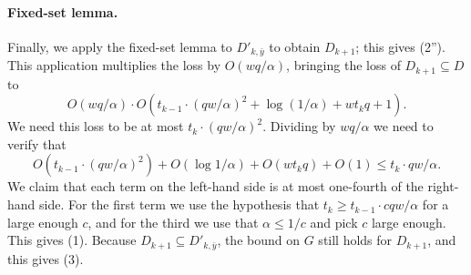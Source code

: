\paragraph{Fixed-set lemma.}
Finally, we apply the fixed-set lemma to $D'_{k,\bar y}$ to obtain $D_{k+1}$; this gives (2''). This application multiplies the loss by $O(wq/\alpha)$, bringing the loss of $D_{k+1}\subseteq D$ to
\[O(wq/\alpha)\cdot O(t_{k-1}\cdot(qw/\alpha)^2+\log(1/\alpha)+wt_kq+1).\]
We need this loss to be at most $t_k\cdot(qw/\alpha)^2$. Dividing by $wq/\alpha$ we need to verify that
\[O(t_{k-1}\cdot(qw/\alpha)^2)+O(\log1/\alpha)+O(wt_kq)+O(1)\leq t_k\cdot qw/\alpha.\]
We claim that each term on the left-hand side is at most one-fourth of the right-hand side. For the first term we use the hypothesis that $t_k\geq t_{k-1}\cdot cqw/\alpha$ for a large enough $c$, and for the third we use that $\alpha\leq1/c$ and pick $c$ large enough. This gives (1).
Because $D_{k+1}\subseteq D'_{k,\bar y}$, the bound on $G$ still holds for $D_{k+1}$, and this gives (3).
